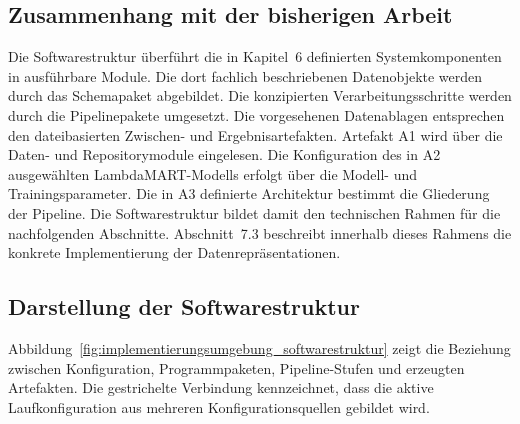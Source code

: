 \subsection{Zusammenhang mit der bisherigen Arbeit} 
\label{subsec:zusammenhang_softwarestruktur} 

Die Softwarestruktur überführt die in Kapitel~6 definierten Systemkomponenten in ausführbare Module. Die dort fachlich beschriebenen Datenobjekte werden durch das Schemapaket abgebildet. 
Die konzipierten Verarbeitungsschritte werden durch die Pipelinepakete umgesetzt. Die vorgesehenen Datenablagen entsprechen den dateibasierten Zwischen- und Ergebnisartefakten. Artefakt A1 wird über die Daten- und Repositorymodule eingelesen. 
Die Konfiguration des in A2 ausgewählten LambdaMART-Modells erfolgt über die Modell- und Trainingsparameter. Die in A3 definierte Architektur bestimmt die Gliederung der Pipeline. 
Die Softwarestruktur bildet damit den technischen Rahmen für die nachfolgenden Abschnitte. Abschnitt~7.3 beschreibt innerhalb dieses Rahmens die konkrete Implementierung der Datenrepräsentationen. 

\subsection{Darstellung der Softwarestruktur} 

\label{subsec:darstellung_softwarestruktur} 
Abbildung~\ref{fig:implementierungsumgebung_softwarestruktur} zeigt die Beziehung zwischen Konfiguration, Programmpaketen, Pipeline-Stufen und erzeugten Artefakten. Die gestrichelte Verbindung kennzeichnet, 
dass die aktive Laufkonfiguration aus mehreren Konfigurationsquellen gebildet wird. 


